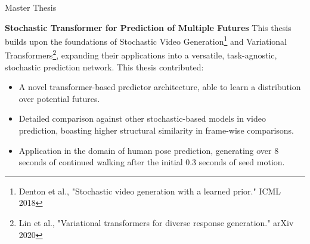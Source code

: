 \begin{rubric}{Master Thesis}

\iffalse
\entry*[2023]%
\textbf{Stochastic Transformer for Prediction of Multiple Futures}  \newline 
This thesis extended the work of Stochastic Video Generation\footnote{Denton et al., "Stochastic video generation with a learned prior." ICML 2018} and Variational Transformers\footnote{Lin et al., "Variational transformers for diverse response generation." arXiv 2020} into a task-agnostic, stochastic prediction network.  Our novel Stochastic Transformer (STTR) was able to learn a distribution over possible futures in video prediction.  Sampling from the distribution produced one potential continuation of the seed video frames.  We further applied this to the task of human pose prediction. 
\fi
\iffalse
\entry*[2023]%
\textbf{Stochastic Transformer for Prediction of Multiple Futures}  \newline 
This thesis builds upon the foundations of Stochastic Video Generation\footnote{Denton et al., "Stochastic video generation with a learned prior." ICML 2018} and Variational Transformers\footnote{Lin et al., "Variational transformers for diverse response generation." arXiv 2020}, expanding their applications into a versatile, task-agnostic, stochastic prediction network. The novel Stochastic Transformer (STTR) successfully learned a distribution over potential futures in video prediction. By sampling from this distribution, we generated diverse potential continuations of the initial video frames. We also applied this approach to the task of human pose prediction.
\fi

\entry*[2023]%
\textbf{Stochastic Transformer for Prediction of Multiple Futures}  \newline 
This thesis builds upon the foundations of Stochastic Video Generation\footnote{Denton et al., "Stochastic video generation with a learned prior." ICML 2018} and Variational Transformers\footnote{Lin et al., "Variational transformers for diverse response generation." arXiv 2020}, expanding their applications into a versatile, task-agnostic, stochastic prediction network.  This thesis contributed: \newline
\vspace{\CVItemizeHeaderSpacing} \begin{itemize} %
	\setlength{\itemsep}{\CVItemizeSpacing}
	\item A novel transformer-based predictor architecture, able to learn a distribution over potential futures.%
	\item Detailed comparison against other stochastic-based models in video prediction, boasting higher structural similarity in frame-wise comparisons.
	\item Application in the domain of human pose prediction, generating over 8 seconds of continued walking after the initial 0.3 seconds of seed motion.
\end{itemize}





\end{rubric}